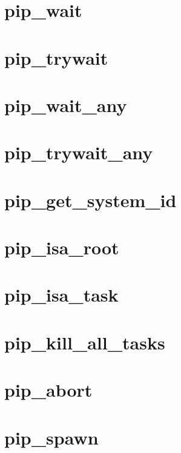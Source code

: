 \documentclass[twoside]{book}
\begin{document}
\chapter{pip\-\_\-wait}
\label{pip_wait}
\hypertarget{pip_wait}{}

\chapter{pip\-\_\-trywait}
\label{pip_trywait}
\hypertarget{pip_trywait}{}

\chapter{pip\-\_\-wait\-\_\-any}
\label{pip_wait_any}
\hypertarget{pip_wait_any}{}

\chapter{pip\-\_\-trywait\-\_\-any}
\label{pip_trywait_any}
\hypertarget{pip_trywait_any}{}

\chapter{pip\-\_\-get\-\_\-system\-\_\-id}
\label{pip_get_system_id}
\hypertarget{pip_get_system_id}{}

\chapter{pip\-\_\-isa\-\_\-root}
\label{pip_isa_root}
\hypertarget{pip_isa_root}{}

\chapter{pip\-\_\-isa\-\_\-task}
\label{pip_isa_task}
\hypertarget{pip_isa_task}{}

\chapter{pip\-\_\-kill\-\_\-all\-\_\-tasks}
\label{pip_kill_all_tasks}
\hypertarget{pip_kill_all_tasks}{}

\chapter{pip\-\_\-abort}
\label{pip_abort}
\hypertarget{pip_abort}{}

\chapter{pip\-\_\-spawn}
\label{pip_spawn}
\hypertarget{pip_spawn}{}

\end{document}
